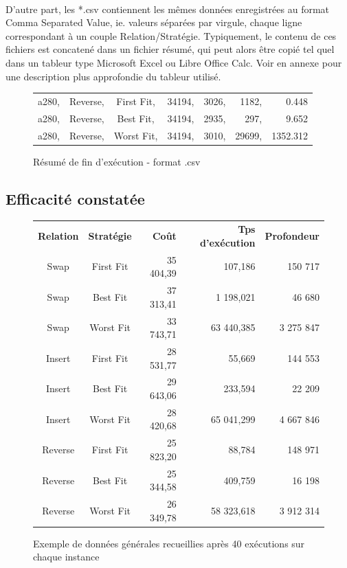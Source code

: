 \documentclass[a4paper,10pt]{report}
\begin{document}
\paragraph{}
  D'autre part, les *.csv contiennent les mêmes données enregistrées au format
Comma Separated Value, ie. valeurs séparées par virgule, chaque ligne
correspondant à un couple Relation/Stratégie. Typiquement, le contenu de ces 
fichiers est concatené dans un fichier résumé, qui peut alors être copié tel
quel dans un tableur type Microsoft Excel ou Libre Office Calc. Voir en annexe
pour une description plus approfondie du tableur utilisé.

\begin{figure}[h]
  \begin{center}
    \begin{tabular}{cccrrrr}
      a280, &Reverse, &First Fit, &34194, &3026, &1182, &0.448\\
      a280, &Reverse, &Best Fit,  &34194, &2935, &297,  &9.652\\
      a280, &Reverse, &Worst Fit, &34194, &3010, &29699,&1352.312\\
    \end{tabular}
  \end{center}
  \label{a280-sample-csv}
  \caption{Résumé de fin d'exécution - format .csv}
\end{figure}

\subsection{Efficacité constatée}

\begin{figure}[h]
  \begin{center}
    \begin{tabular}{ccrrr}
      \textbf{Relation}& \textbf{Stratégie}& \textbf{Coût}& \textbf{Tps
d'exécution}& \textbf{Profondeur}\\
      Swap&	First Fit&	35 404,39&	107,186&	150 717\\
      Swap&	Best Fit&	37 313,41&	1 198,021&	46 680\\
      Swap&	Worst Fit&	33 743,71&	63 440,385&	3 275 847\\
      Insert&	First Fit&	28 531,77&	55,669&		144 553\\
      Insert&	Best Fit&	29 643,06&	233,594&	22 209\\
      Insert&	Worst Fit&	28 420,68&	65 041,299&	4 667 846\\
      Reverse&	First Fit&	25 823,20&	88,784&		148 971\\
      Reverse&	Best Fit&	25 344,58&	409,759&	16 198\\
      Reverse&	Worst Fit&	26 349,78&	58 323,618&	3 912 314\\
    \end{tabular}
  \end{center}
  \label{recap-general}
  \caption{Exemple de données générales recueillies après 40 exécutions sur
chaque instance}
\end{figure}
\end{document}
